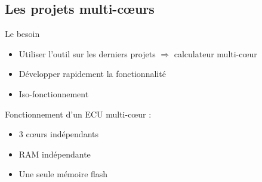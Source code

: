 \documentclass{beamer}
\begin{document}
	\subsection{Les projets multi-cœurs}
	\begin{frame}{Le besoin}
		\begin{itemize}
			\item Utiliser l'outil sur les derniers projets\newline
			$\Rightarrow$ calculateur multi-cœur
			\item Développer rapidement la fonctionnalité
			\item Iso-fonctionnement
		\end{itemize}
		\pause
		Fonctionnement d'un ECU multi-cœur : 
		\begin{itemize}
			\item 3 cœurs indépendants
			\item RAM indépendante
			\item Une seule mémoire flash
		\end{itemize}
		
		

	\end{frame}
	
\end{document}

